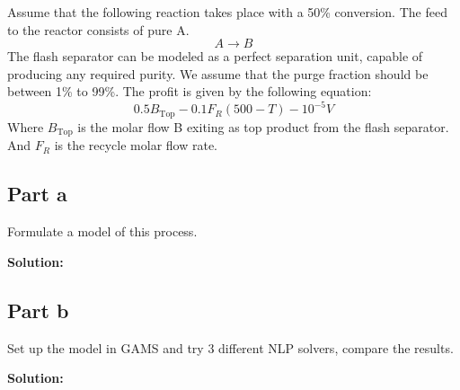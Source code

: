 \documentclass[11pt]{article}
\begin{document}
Assume that the following reaction takes place with a 50\% conversion. The feed to
the reactor consists of pure A.
\[ A \rightarrow B \]
The flash separator can be modeled as a perfect separation unit, capable of
producing any required purity.
We assume that the purge fraction should be between 1\% to 99\%.
The profit is given by the following equation:
\[ 0.5B_{\text{Top}} - 0.1F_R(500 - T) - 10^{-5}V \]
Where $B_{\text{Top}}$ is the molar flow B exiting as top product from the flash separator. 
And $F_R$ is the recycle molar flow rate.

\subsection{Part a}
Formulate a model of this process.

\textbf{Solution: }

\subsection{Part b}
Set up the model in GAMS and try 3 different NLP solvers, compare the results.

\textbf{Solution: }
\end{document}

